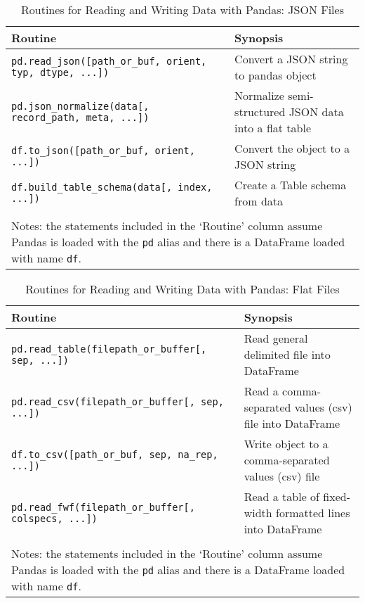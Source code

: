 \documentclass[a4paper,11pt]{book}
\numberwithin{figure}{chapter}
\numberwithin{table}{chapter}
\begin{document}
\begin{sidewaystable}[!htbp]
	\centering
	\caption{Routines for Reading and Writing Data with Pandas: JSON Files}
	\label{tab:io_json}
	\begin{tabular}{lp{12cm}}
		\toprule \toprule
			Routine & Synopsis \\
			\midrule
			\texttt{pd.read\_json([path\_or\_buf, orient, typ, dtype, ...])} &
                        Convert a JSON string to pandas object\\
                        \texttt{pd.json\_normalize(data[, record\_path, meta, ...])} &
                        Normalize semi-structured JSON data into a flat table\\
                        \texttt{df.to\_json([path\_or\_buf, orient, ...])} &
                        Convert the object to a JSON string\\
                        \texttt{df.build\_table\_schema(data[, index, ...])} & 
                        Create a Table schema from data\\
			\bottomrule \\[-1.8ex]
		    \multicolumn{2}{l}{Notes: the statements included in the `Routine' column assume Pandas is loaded with the \texttt{pd} alias and there is a DataFrame loaded with name \texttt{df}.} \\
	\end{tabular}
\end{sidewaystable}

\begin{sidewaystable}[!htbp]
	\centering
	\caption{Routines for Reading and Writing Data with Pandas: Flat Files}
	\label{tab:io_flat}
	\begin{tabular}{lp{12cm}}
		\toprule \toprule
			Routine & Synopsis \\
			\midrule
			\texttt{pd.read\_table(filepath\_or\_buffer[, sep, ...])} & 
			Read general delimited file into DataFrame\\
			\texttt{pd.read\_csv(filepath\_or\_buffer[, sep, ...])} &
                        Read a comma-separated values (csv) file into DataFrame\\
			\texttt{df.to\_csv([path\_or\_buf, sep, na\_rep, ...])} & 
			Write object to a comma-separated values (csv) file\\ 
			\texttt{pd.read\_fwf(filepath\_or\_buffer[, colspecs, ...])} &
			Read a table of fixed-width formatted lines into DataFrame\\
			\bottomrule \\[-1.8ex]
		    \multicolumn{2}{l}{Notes: the statements included in the `Routine' column assume Pandas is loaded with the \texttt{pd} alias and there is a DataFrame loaded with name \texttt{df}.} \\
	\end{tabular}
\end{sidewaystable}
\end{document}
